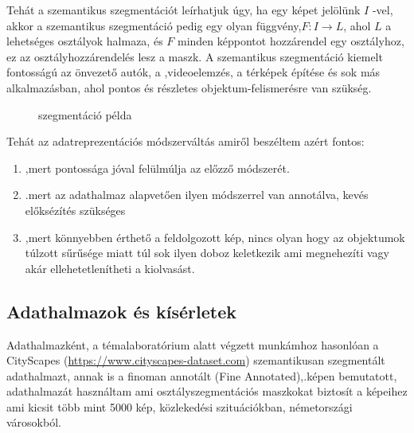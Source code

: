 \documentclass[12pt,oneside,a4paper]{article}
\theoremstyle{remark}
\begin{document}
Tehát a szemantikus szegmentációt leírhatjuk úgy, ha egy képet jelölünk \(I\) -vel, akkor a szemantikus
szegmentáció pedig egy olyan függvény,\(F: I \rightarrow L\), ahol \(L\) a lehetséges osztályok halmaza, és \(F\) minden
képpontot hozzárendel egy osztályhoz, ez az osztályhozzárendelés lesz a maszk.
A szemantikus szegmentáció kiemelt fontosságú az önvezető autók, a
,videoelemzés, a térképek építése és sok más
alkalmazásban, ahol pontos és részletes objektum-felismerésre van szükség.
\begin{figure}[ht]
    \centering
    \caption{szegmentáció példa}
\end{figure}
Tehát az adatreprezentációs módszerváltás amiről beszéltem azért fontos:
\begin{enumerate}
    \item ,mert pontossága jóval felülmúlja az előzző módszerét.
    \item .mert az adathalmaz alapvetően ilyen módszerrel van annotálva, kevés előksézítés szükséges
    \item ,mert könnyebben érthető a feldolgozott kép, nincs olyan hogy az objektumok túlzott sűrűsége miatt túl sok ilyen doboz keletkezik ami megnehezíti vagy akár ellehetetlenítheti a kiolvasást.
\end{enumerate}


\subsection{Adathalmazok és kísérletek}\label{subsec:adathalmazok-es-kiserletek}
    Adathalmazként, a témalaboratórium alatt végzett munkámhoz hasonlóan a CityScapes
    (\url{https://www.cityscapes-dataset.com}) szemantikusan szegmentált adathalmazt, annak is a finoman annotált
    (Fine Annotated),\label{kephivatkozas}.képen bemutatott,
    adathalmazát használtam ami osztályszegmentációs maszkokat biztosít a képeihez ami kicsit több mint 5000 kép, közlekedési szituációkban,
    németországi városokból.
\end{document}
